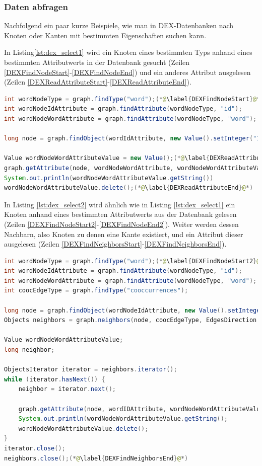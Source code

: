 \documentclass[11pt, a4paper, oneside]{article} %
\begin{document}
\subsubsection{Daten abfragen}
Nachfolgend ein paar kurze Beispiele, wie man in DEX-Datenbanken nach Knoten oder Kanten mit bestimmten Eigenschaften suchen kann.

In Listing\ref{lst:dex_select1} wird ein Knoten eines bestimmten Typs anhand eines bestimmten Attributwerts in der Datenbank gesucht (Zeilen \ref{DEXFindNodeStart}-\ref{DEXFindNodeEnd}) und ein anderes Attribut ausgelesen (Zeilen \ref{DEXReadAttributeStart}-\ref{DEXReadAttributeEnd}).

\begin{lstlisting}[caption={DEX - Daten abfragen - Knoten wiederfinden},label={lst:dex_select1},language=Java]
int wordNodeType = graph.findType("word");(*@\label{DEXFindNodeStart}@*)
int wordNodeIdAttribute = graph.findAttribute(wordNodeType, "id");
int wordNodeWordAttribute = graph.findAttribute(wordNodeType, "word");

long node = graph.findObject(wordIdAttribute, new Value().setInteger("1"));(*@\label{DEXFindNodeEnd}@*)

Value wordNodeWordAttributeValue = new Value();(*@\label{DEXReadAttributeStart}@*)
graph.getAttribute(node, wordNodeWordAttribute, wordNodeWordAttributeValue);
System.out.println(wordNodeWordAttributeValue.getString())
wordNodeWordAttributeValue.delete();(*@\label{DEXReadAttributeEnd}@*)
\end{lstlisting}

In Listing \ref{lst:dex_select2} wird ähnlich wie in Listing \ref{lst:dex_select1} ein Knoten anhand eines bestimmten Attributwerts aus der Datenbank gelesen (Zeilen \ref{DEXFindNodeStart2}-\ref{DEXFindNodeEnd2}). Weiter werden dessen Nachbarn, also Knoten zu denen eine Kante existiert, und ein Attribut dieser ausgelesen (Zeilen \ref{DEXFindNeighborsStart}-\ref{DEXFindNeighborsEnd}).

\begin{lstlisting}[caption={DEX - Daten abfragen - alle Nachbarn eines Knotens},label={lst:dex_select2},language=Java]
int wordNodeType = graph.findType("word");(*@\label{DEXFindNodeStart2}@*)
int wordNodeIdAttribute = graph.findAttribute(wordNodeType, "id");
int wordNodeWordAttribute = graph.findAttribute(wordNodeType, "word");
int coocEdgeType = graph.findType("cooccurrences");

long node = graph.findObject(wordNodeIdAttribute, new Value().setInteger("1"));(*@\label{DEXFindNodeEnd2}@*)
Objects neighbors = graph.neighbors(node, coocEdgeType, EdgesDirection.Outgoing);(*@\label{DEXFindNeighborsStart}@*)

Value wordNodeWordAttributeValue;
long neighbor;

ObjectsIterator iterator = neighbors.iterator();
while (iterator.hasNext()) {
	neighbor = iterator.next();

	graph.getAttribute(node, wordIDAttribute, wordNodeWordAttributeValue = new Value());
	System.out.println(wordNodeWordAttributeValue.getString();
	wordNodeWordAttributeValue.delete();
}
iterator.close();
neighbors.close();(*@\label{DEXFindNeighborsEnd}@*)
\end{lstlisting}
\end{document}
